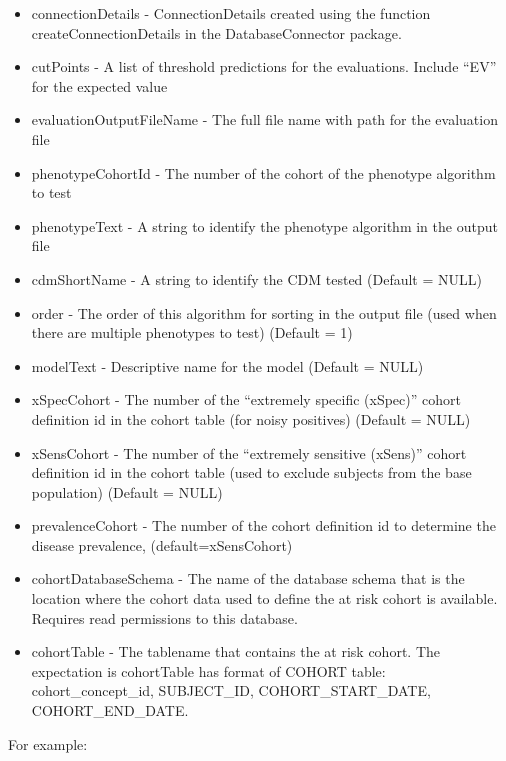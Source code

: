 \documentclass[]{article}
\providecommand{\tightlist}{%
  \setlength{\itemsep}{0pt}\setlength{\parskip}{0pt}}
\begin{document}
\begin{itemize}
\tightlist
\item
  connectionDetails - ConnectionDetails created using the function
  createConnectionDetails in the DatabaseConnector package.
\item
  cutPoints - A list of threshold predictions for the evaluations.
  Include ``EV'' for the expected value
\item
  evaluationOutputFileName - The full file name with path for the
  evaluation file
\item
  phenotypeCohortId - The number of the cohort of the phenotype
  algorithm to test
\item
  phenotypeText - A string to identify the phenotype algorithm in the
  output file
\item
  cdmShortName - A string to identify the CDM tested (Default = NULL)
\item
  order - The order of this algorithm for sorting in the output file
  (used when there are multiple phenotypes to test) (Default = 1)
\item
  modelText - Descriptive name for the model (Default = NULL)
\item
  xSpecCohort - The number of the ``extremely specific (xSpec)'' cohort
  definition id in the cohort table (for noisy positives) (Default =
  NULL)
\item
  xSensCohort - The number of the ``extremely sensitive (xSens)'' cohort
  definition id in the cohort table (used to exclude subjects from the
  base population) (Default = NULL)
\item
  prevalenceCohort - The number of the cohort definition id to determine
  the disease prevalence, (default=xSensCohort)
\item
  cohortDatabaseSchema - The name of the database schema that is the
  location where the cohort data used to define the at risk cohort is
  available. Requires read permissions to this database.
\item
  cohortTable - The tablename that contains the at risk cohort. The
  expectation is cohortTable has format of COHORT table:
  cohort\_concept\_id, SUBJECT\_ID, COHORT\_START\_DATE,
  COHORT\_END\_DATE.
\end{itemize}

For example:
\end{document}

